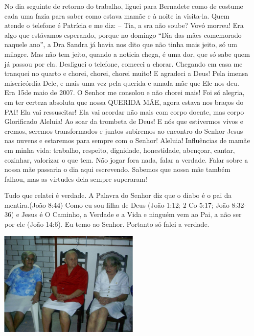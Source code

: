 \documentclass[
  brazil,
  a6paper,
  oneside,
  landscape,
  14pt]{scrbook}
\begin{document}
No dia seguinte de retorno do trabalho, liguei para Bernadete como de
costume cada uma fazia para saber como estava mamãe e à noite ia
visita-la. Quem atende o telefone é Patrícia e me diz: -- Tia, a sra não
soube? Vovó morreu! Era algo que estávamos esperando, porque no domingo
``Dia das mães comemorado naquele ano'', a Dra Sandra já havia nos dito
que não tinha mais jeito, só um milagre. Mas não tem jeito, quando a
noticia chega, é uma dor, que só sabe quem já passou por ela. Desliguei
o telefone, comecei a chorar. Chegando em casa me tranquei no quarto e
chorei, chorei, chorei muito! E agradeci a Deus! Pela imensa
misericórdia Dele, e mais uma vez pela querida e amada mãe que Ele nos
deu. Era 15de maio de 2007. O Senhor me consolou e não chorei mais! Foi
só alegria, em ter certeza absoluta que nossa QUERIDA MÃE, agora estava
nos braços do PAI! Ela vai ressuscitar! Ela vai acordar não mais com
corpo doente, mas corpo Glorificado Aleluia! Ao soar da trombeta de
Deus! E nós que estivermos vivos e cremos, seremos transformados e
juntos subiremos ao encontro do Senhor Jesus nas nuvens e estaremos para
sempre com o Senhor! Aleluia! Influências de mamãe em minha vida:
trabalho, respeito, dignidade, honestidade, abençoar, cantar, cozinhar,
valorizar o que tem. Não jogar fora nada, falar a verdade. Falar sobre a
nossa mãe passaria o dia aqui escrevendo. Sabemos que nossa mãe também
falhou, mas as virtudes dela sempre superaram!

Tudo que relatei é verdade. A Palavra do Senhor diz que o diabo é o pai
da mentira.(João 8:44) Como eu sou filha de Deus (João 1:12; 2 Co 5:17;
João 8:32-36) e Jesus é O Caminho, a Verdade e a Vida e ninguém vem ao
Pai, a não ser por ele (João 14:6). Eu temo ao Senhor. Portanto só falei
a verdade.

\includegraphics[width=2.72785in,height=2.04669in]{img/lourdes/image2.jpeg}
\end{document}
